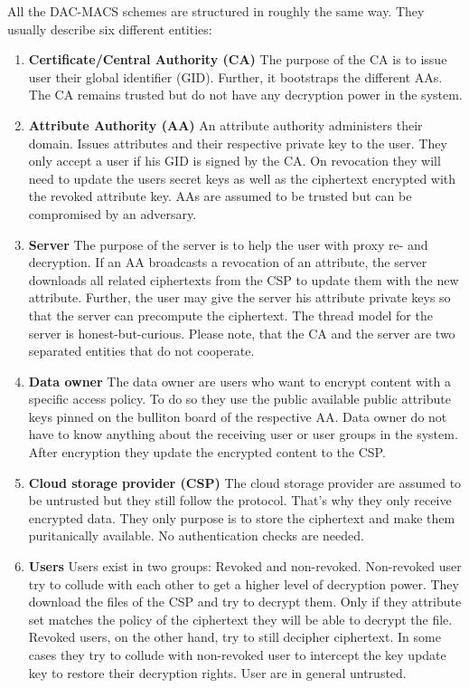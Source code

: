 All the \ac{DAC-MACS} schemes are structured in roughly the same way. They usually describe six different entities:

\begin{enumerate}
	\item \textbf{Certificate/Central Authority (\ac{CA})} The purpose of the \ac{CA} is to issue user their global identifier (\ac{GID}). Further, it bootstraps the different \ac{AA}s. The \ac{CA} remains trusted but do not have any decryption power in the system. 
	\item \textbf{Attribute Authority (\ac{AA})} An attribute authority administers their domain. Issues attributes and their respective private key to the user. They only accept a user if his \ac{GID} is signed by the \ac{CA}. 
	On revocation they will need to update the users secret keys as well as the ciphertext encrypted with the revoked attribute key. \ac{AA}s are assumed to be trusted but can be compromised by an adversary.
	\item \textbf{Server} The purpose of the server is to help the user with proxy re- and decryption. If an \ac{AA} broadcasts a revocation of an attribute, the server downloads all related ciphertexts from the \ac{CSP} to update them with the new attribute. 
	Further, the user may give the server his attribute private keys so that the server can precompute the ciphertext. The thread model for the server is honest-but-curious. Please note, that the \ac{CA} and the server are two separated entities that do not cooperate.
	\item \textbf{Data owner} The data owner are users who want to encrypt content with a specific access policy. To do so they use the public available public attribute keys pinned on the bulliton board of the respective \ac{AA}. Data owner do not have to know anything about the receiving user or user groups in the system. After encryption they update the encrypted content to the \ac{CSP}.
	\item \textbf{Cloud storage provider (\ac{CSP})} The cloud storage provider are assumed to be untrusted but they still follow the protocol. That’s why they only receive encrypted data. They only purpose is to store the ciphertext and make them puritanically available. No authentication checks are needed.
	\item \textbf{Users} Users exist in two groups: Revoked and non-revoked. Non-revoked user try to collude with each other to get a higher level of decryption power. They download the files of the \ac{CSP} and try to decrypt them. Only if they attribute set matches the policy of the ciphertext they will be able to decrypt the file. 
	Revoked users, on the other hand, try to still decipher ciphertext. In some cases they try to collude with non-revoked user to intercept the key update key to restore their decryption rights. 
	User are in general untrusted.
\end{enumerate} 

